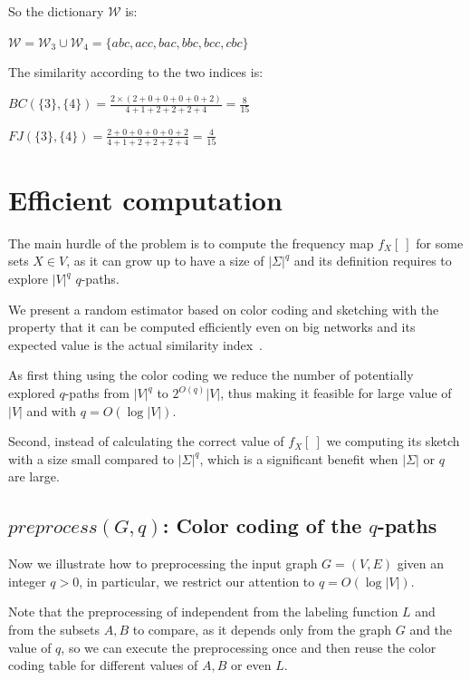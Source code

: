So the dictionary $\mathcal{W}$ is: \medskip
		
$\mathcal{W} = \mathcal{W}_3 \cup \mathcal{W}_4 = \{ abc, acc, bac, bbc, bcc, cbc \}$\bigskip
		
The similarity according to the two indices is: \medskip

$BC(\{3\}, \{4\}) = \frac{2 \times ( 2 + 0 + 0 + 0 + 0 + 2 ) }{ 4 + 1 + 2 + 2 + 2 + 4 } = \frac{8}{15}$ \medskip
		
$FJ(\{3\}, \{4\}) = \frac{ 2 + 0 + 0 + 0 + 0 + 2 }{ 4 + 1 + 2 + 2 + 2 + 4 } = \frac{4}{15}$ \medskip
		
\clearpage

\section{Efficient computation}

The main hurdle of the problem is to compute the frequency map $f_{X}[\ ]$ for some sets $X \in V$, as it can grow up to have a size of $|\Sigma|^{q}$ and its definition requires to explore $|V|^{q}$ $q$-paths.\medskip

We present a random estimator based on color coding and sketching with the property that it can be computed efficiently even on big networks and its expected value is the actual similarity index~\cite{SubSim}.\medskip

As first thing using the color coding we reduce the number of potentially explored $q$-paths from $|V|^{q}$ to $2^{O(q)}|V|$, thus making it feasible for large value of $|V|$ and with $q = O(\log |V|)$.

Second, instead of calculating the correct value of $f_{X}[\ ]$ we computing its sketch with a size small compared to $|\Sigma|^{q}$, which is a significant benefit when $|\Sigma|$ or $q$ are large.

\subsection*{$preprocess(G,q)$: Color coding of the $q$-paths}

Now we illustrate how to preprocessing the input graph $G=(V,E)$ given an integer $q > 0$, in particular, we restrict our attention to $q = O(\log |V|)$.

Note that the preprocessing of independent from the labeling function $L$ and from the subsets $A,B$ to compare, as it depends only from the graph $G$ and the value of $q$, so we can execute the preprocessing once and then reuse the color coding table for different values of $A,B$ or even $L$.\medskip

